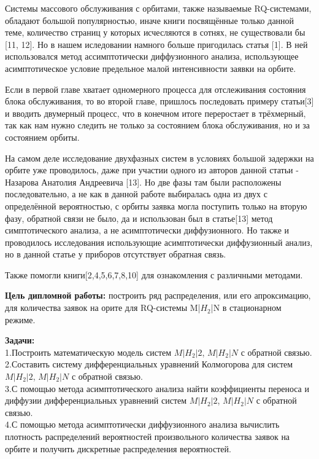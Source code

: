 
\hspace*{\parindent}%
Системы массового обслуживания с орбитами, также называемые RQ-системами, обладают большой популярностью, иначе книги посвящённые только данной теме, количество страниц у которых исчесляются в сотнях,  не существовали бы [11, 12]. Но в нашем иследовании намного больше пригодилась статья [1]. В ней использовался метод ассимптотически диффузионного анализа, использующее асимптотическое условие предельное малой интенсивности заявки на орбите.

Если в первой главе хватает одномерного процесса для отслеживания состояния блока обслуживания, то во второй главе, пришлось последовать примеру статьи[3] и вводить двумерный процесс, что в конечном итоге переростает в трёхмерный, так как нам нужно следить не только за состоянием блока обслуживания, но и за состоянием орбиты.

На самом деле исследование двухфазных систем в условиях большой задержки на орбите уже проводилось, даже при участии одного из авторов данной статьи - Назарова Анатолия Андреевича [13]. Но две фазы там были расположены последовательно, а не как в данной работе выбиралась одна из двух с определённой вероятностью, с орбиты заявка могла поступить только на вторую фазу, обратной связи не было, да и использован был в статье[13] метод симптотического анализа, а не асимптотически диффузионного. Но также и проводилось исследования использующие асимптотически диффузионный анализ, но в данной статье у приборов отсутствует обратная связь.

Также помогли книги[2,4,5,6,7,8,10] для ознакомления с различными методами.

\textbf{Цель дипломной работы:} построить ряд распределения, или его апроксимацию, для количества заявок на орите для RQ-системы M|$H_2$|N в стационарном режиме.

\textbf{Задачи:}\\
1.Построить математическую модель систем $M|H_{2}|2$, $M|H_{2}|N$ с обратной связью.\\
2.Составить систему дифференциальных уравнений Колмогорова для систем $M|H_{2}|2$, $M|H_{2}|N$ с обратной связью.\\
3.С помощью метода асимптотического анализа найти коэффициенты переноса и диффузии дифференциальных уравнений систем $M|H_{2}|2$, $M|H_{2}|N$ с обратной связью.\\
4.С помощью метода асимптотически диффузионного анализа вычислить плотность распределений вероятностей произвольного количества заявок на орбите и получить дискретные распределения вероятностей.

 
